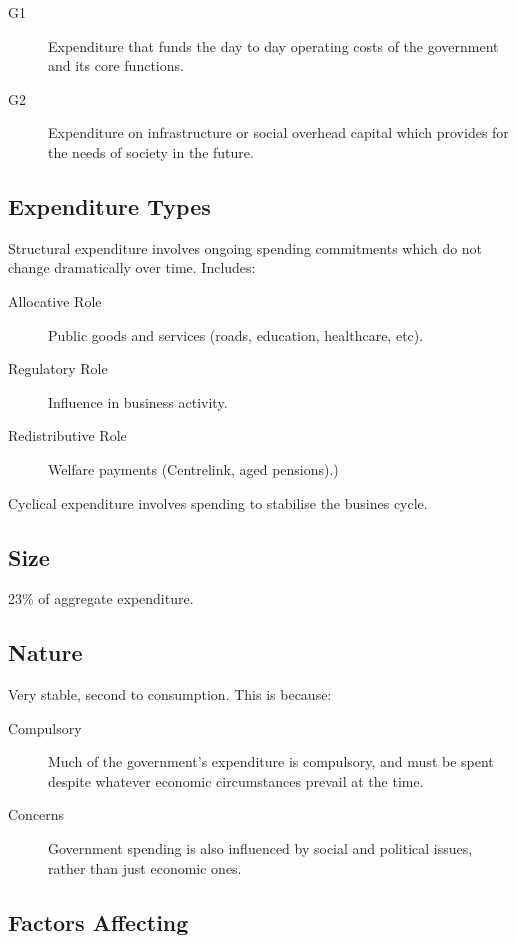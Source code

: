 \documentclass[a4paper,11pt]{article}
\begin{document}
\begin{description}
\item [G1] Expenditure that funds the day to day operating costs of the
	government and its core functions.
\item [G2] Expenditure on infrastructure or social overhead capital which
	provides for the needs of society in the future.
\end{description}


\subsection{Expenditure Types}

Structural expenditure involves ongoing spending commitments which do not
change dramatically over time. Includes:

\begin{description}
\item [Allocative Role] Public goods and services (roads, education, healthcare,
	etc).
\item [Regulatory Role] Influence in business activity.
\item [Redistributive Role] Welfare payments (Centrelink, aged pensions).)
\end{description}

Cyclical expenditure involves spending to stabilise the busines cycle.


\subsection{Size}

23\% of aggregate expenditure.


\subsection{Nature}

Very stable, second to consumption. This is because:

\begin{description}
\item [Compulsory] Much of the government's expenditure is compulsory, and must
	be spent despite whatever economic circumstances prevail at the time.
\item [Concerns] Government spending is also influenced by social and political
	issues, rather than just economic ones.
\end{description}


\subsection{Factors Affecting}
\end{document}
